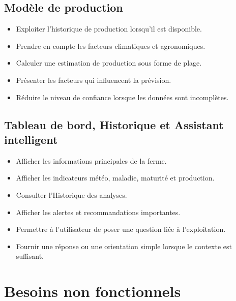 \documentclass[12pt,a4paper]{report}
\begin{document}
\subsection{Modèle de production}
\begin{itemize}
    \item Exploiter l'historique de production lorsqu'il est disponible.
    \item Prendre en compte les facteurs climatiques et agronomiques.
    \item Calculer une estimation de production sous forme de plage.
    \item Présenter les facteurs qui influencent la prévision.
    \item Réduire le niveau de confiance lorsque les données sont incomplètes.
\end{itemize}

\subsection{Tableau de bord, Historique et Assistant intelligent}
\begin{itemize}
    \item Afficher les informations principales de la ferme.
    \item Afficher les indicateurs météo, maladie, maturité et production.
    \item Consulter l'Historique des analyses.
    \item Afficher les alertes et recommandations importantes.
    \item Permettre à l'utilisateur de poser une question liée à l'exploitation.
    \item Fournir une réponse ou une orientation simple lorsque le contexte est suffisant.
\end{itemize}

\section{Besoins non fonctionnels}
\end{document}

